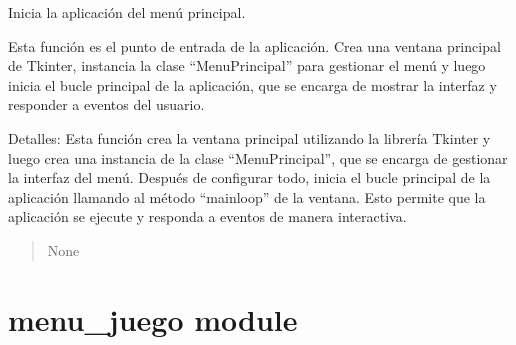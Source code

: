 \documentclass[letterpaper,10pt,spanish]{sphinxmanual}
\begin{document}
\begin{fulllineitems}
\begin{fulllineitems}
\begin{quote}
\begin{description}
\end{description}\end{quote}

\end{fulllineitems}


\end{fulllineitems}


\begin{fulllineitems}
\label{\detokenize{main:main.main}}
\pysigstartsignatures
{}
\pysigstopsignatures
\sphinxAtStartPar
Inicia la aplicación del menú principal.

\sphinxAtStartPar
Esta función es el punto de entrada de la aplicación. Crea una ventana principal de Tkinter, instancia la clase
“MenuPrincipal” para gestionar el menú y luego inicia el bucle principal de la aplicación, que se encarga de
mostrar la interfaz y responder a eventos del usuario.

\sphinxAtStartPar
Detalles:
Esta función crea la ventana principal utilizando la librería Tkinter y luego crea una instancia de la clase
“MenuPrincipal”, que se encarga de gestionar la interfaz del menú. Después de configurar todo, inicia el bucle
principal de la aplicación llamando al método “mainloop” de la ventana. Esto permite que la aplicación se ejecute
y responda a eventos de manera interactiva.
\begin{quote}\begin{description}
\sphinxAtStartPar
None

\end{description}\end{quote}

\end{fulllineitems}


\sphinxstepscope


\chapter{menu\_juego module}
\label{\detokenize{menu_juego:module-menu_juego}}\label{\detokenize{menu_juego:menu-juego-module}}\label{\detokenize{menu_juego::doc}}
\end{document}
